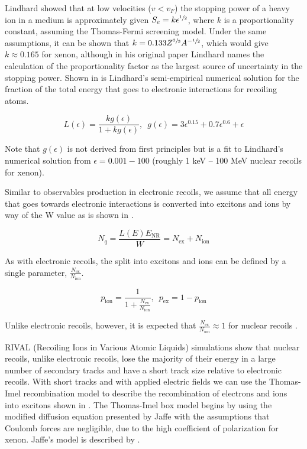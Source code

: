 Lindhard showed that at low velocities ($v < v_F$) the stopping power of a heavy ion in a medium is approximately given $S_e = k \epsilon^{\sfrac{1}{2}}$, where $k$ is a proportionality constant, assuming the Thomas-Fermi screening model.  Under the same assumptions, it can be shown that $k = 0.133 Z^{\sfrac{2}{3}} A^{-\sfrac{1}{2}}$, which would give $k \approx 0.165$ for xenon, although in his original paper Lindhard names the calculation of the proportionality factor as the largest source of uncertainty in the stopping power.  Shown in  is Lindhard's semi-empirical numerical solution for the fraction of the total energy that goes to electronic interactions for recoiling atoms.

\begin{equation}
        \label{eqn:lindhard_electronic}
        L(\epsilon) = \frac{k g(\epsilon)}{1 + k g(\epsilon)}, \, \, \, g(\epsilon) = 3 \epsilon^{0.15} + 0.7 \epsilon^{0.6} + \epsilon
\end{equation}

Note that $g(\epsilon)$ is not derived from first principles but is a fit to Lindhard's numerical solution from $\epsilon = 0.001 - 100$ (roughly 1 keV -- 100 MeV nuclear recoils for xenon).

Similar to observables production in electronic recoils, we assume that all energy that goes towards electronic interactions is converted into excitons and ions by way of the W value as is shown in .

\begin{equation}
        \label{eqn:quanta_nr}
        N_q = \frac{L(E) E_{\textrm{NR}}}{W} = N_{\textrm{ex}} + N_{\textrm{ion}}
\end{equation}

As with electronic recoils, the split into excitons and ions can be defined by a single parameter, $\frac{N_{\textrm{ex}}}{N_{\textrm{ion}}}$.

\begin{equation}
        p_{\textrm{ion}} = \frac{1}{1 + \frac{N_{\textrm{ex}}}{N_{\textrm{ion}}}}, \, \, \, p_{\textrm{ex}} = 1 - p_{\textrm{ion}}
\end{equation}

Unlike electronic recoils, however, it is expected that $\frac{N_{\textrm{ex}}}{N_{\textrm{ion}}} \approx 1$ for nuclear recoils \cite{angle2011search, sorensen2011nuclear, lenardo2015global}.

RIVAL (Recoiling Ions in Various Atomic Liquids) simulations show that nuclear recoils, unlike electronic recoils, lose the majority of their energy in a large number of secondary tracks and have a short track size relative to electronic recoils.  With short tracks and with applied electric fields we can use the Thomas-Imel recombination model to describe the recombination of electrons and ions into excitons shown in  \cite{dahl_thesis}.   The Thomas-Imel box model \cite{thomas1987recombination} begins by using the modified diffusion equation presented by Jaffe \cite{jaffe1913theory} with the assumptions that Coulomb forces are negligible, due to the high coefficient of polarization for xenon.  Jaffe's model is described by .

